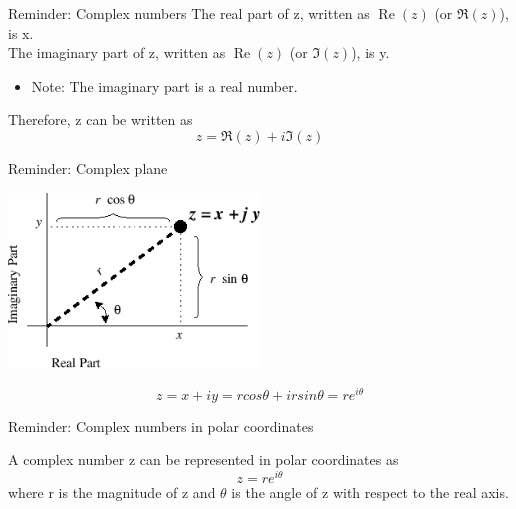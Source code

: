 {\begin{frame}{Reminder: Complex numbers}
\vspace{0.3cm}
The real part of z, written as $\operatorname{Re}(z)$ (or $\Re(z)$), is x.\\

\vspace{0.3cm}
The imaginary part of z, written as $\operatorname{Re}(z)$ (or $\Im(z)$), is y.\\
\begin{itemize}
  \item Note: The imaginary part is a real number.
\end{itemize}

\vspace{0.3cm}
Therefore, z can be written as
\begin{equation*}
  z = \Re(z) + i \Im(z)
\end{equation*}

\end{frame}

%
%
%

\begin{frame}{Reminder: Complex plane}

\begin{center}
  \includegraphics[width=0.50\textwidth]{./images/schematics/complex_plane}
\end{center}

\begin{equation*}
  z = x + i y = r cos\theta + i r sin\theta = r e^{i \theta}
\end{equation*}

\end{frame}


%
%
%

\begin{frame}{Reminder: Complex numbers in polar coordinates}

A complex number z can be represented in polar coordinates as
\begin{equation*}
  z = r e^{i \theta}
\end{equation*}
where r is the magnitude of z and $\theta$ is the angle of z
with respect to the real axis.\\


\end{frame}}
